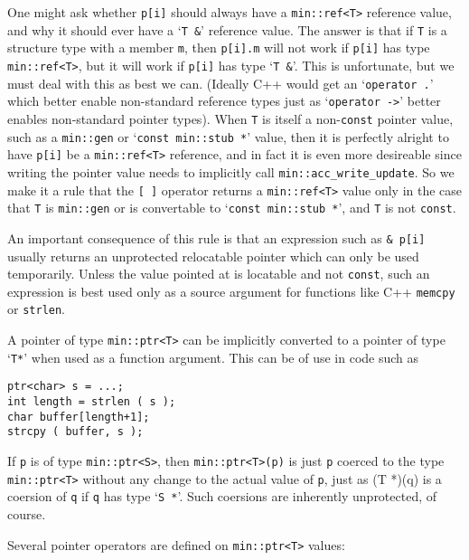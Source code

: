 \documentclass[12pt]{article}
\newcommand{\EOL}{\penalty \exhyphenpenalty}
\newenvironment{indpar}[1][0.3in]%
	{\begin{list}{}%
		     {\setlength{\itemsep}{0in}%
		      \setlength{\topsep}{0in}%
		      \setlength{\parsep}{1ex}%
		      \setlength{\labelwidth}{#1}%
		      \setlength{\leftmargin}{#1}%
		      \addtolength{\leftmargin}{\labelsep}}%
	 \item}%
	{\end{list}}
\begin{document}
One might ask whether {\tt p[i]} should always have a {\tt min::\EOL ref<T>}
reference value, and why it should ever have a `{\tt T \&}' reference
value.  The answer is that if {\tt T} is a structure type with a member
{\tt m}, then {\tt p[i].m} will not work if {\tt p[i]} has type
{\tt min::\EOL ref<T>}, but it will work if {\tt p[i]} has type
`{\tt T \&}'.  This is unfortunate, but we must deal with this as best
we can.  (Ideally C++ would get an `{\tt operator .}' which better
enable non-standard reference types just as
`{\tt operator ->}' better enables non-standard pointer types).
When {\tt T} is itself a non-{\tt const}
pointer value, such as a {\tt min::gen} or
`{\tt const min::\EOL stub~*}' value, then it is perfectly alright
to have {\tt p[i]} be a {\tt min::\EOL ref<T>} reference, and in
fact it is even more desireable since writing the pointer value
needs to implicitly call {\tt min::\EOL acc\_\EOL write\_\EOL update}.
So we make it a rule that the {\tt [~]} operator returns a
{\tt min::ref<T>} value only in the case that {\tt T} is
{\tt min::\EOL gen} or is convertable to `{\tt const min::\EOL stub~*}',
and {\tt T} is not {\tt const}.

An important consequence of this rule is that an expression such as
{\tt \& p[i]} usually returns an unprotected relocatable pointer which can only
be used temporarily.  Unless the value pointed at is locatable
and not {\tt const}, such an expression is best used only as a source
argument for functions like C++ {\tt memcpy} or {\tt strlen}.

A pointer of type {\tt min::ptr<T>} can be implicitly converted to a
pointer of type `{\tt T*}' when used as a function argument.
This can be of use in code such as
\begin{indpar}\begin{verbatim}
ptr<char> s = ...;
int length = strlen ( s );
char buffer[length+1];
strcpy ( buffer, s );
\end{verbatim}\end{indpar}

If {\tt p} is of type {\tt min::ptr<S>}, then {\tt min::ptr<T>(p)} is just
{\tt p} coerced to the type {\tt min::\EOL ptr<T>} without any change to the
actual value of {\tt p}, just as {(T *)(q)} is a coersion of {\tt q}
if {\tt q} has type `{\tt S *}'.  Such coersions are inherently
unprotected, of course.

Several pointer operators are defined on {\tt min::ptr<T>} values:
\end{document}
